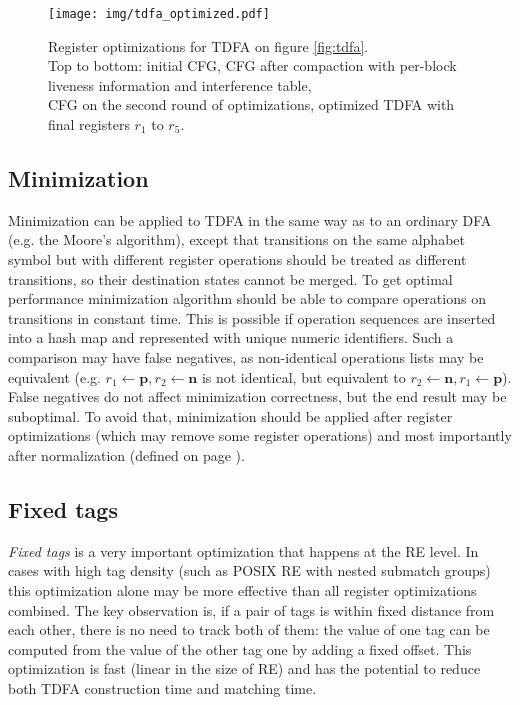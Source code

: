 \documentclass[]{article}
\begin{document}
\begin{figure}[]
\texttt{[image: img/tdfa\_optimized.pdf]}
\vspace{0.5em}
\caption{
Register optimizations for TDFA on figure \ref{fig:tdfa}. \\
Top to bottom: initial CFG,
CFG after compaction with per-block liveness information and interference table,\\
CFG on the second round of optimizations,
optimized TDFA with final registers $r_1$ to $r_5$.
}\label{fig:tdfa_regopt}
\end{figure}

\subsection{Minimization}

Minimization can be applied to TDFA in the same way as to an ordinary DFA (e.g. the Moore's algorithm),
except that transitions on the same alphabet symbol but with different register operations
should be treated as different transitions, so their destination states cannot be merged.
To get optimal performance minimization algorithm should be able to compare operations on transitions in constant time.
This is possible if operation sequences are inserted into a hash map and represented with unique numeric identifiers.
Such a comparison may have false negatives, as non-identical operations lists may be equivalent
(e.g. $r_1 \leftarrow \mathbf{p}, r_2 \leftarrow \mathbf{n}$ is not identical, but equivalent to $r_2 \leftarrow \mathbf{n}, r_1 \leftarrow \mathbf{p}$).
False negatives do not affect minimization correctness, but the end result may be suboptimal.
To avoid that, minimization should be applied after register optimizations (which may remove some register operations)
and most importantly after normalization (defined on page \pageref{alg_opt2}).

\subsection{Fixed tags}

\newcommand\nan{N\!an}
\newcommand\nobasetag{-1}%

\emph{Fixed tags} is a very important optimization that happens at the RE level.
In cases with high tag density (such as POSIX RE with nested submatch groups)
this optimization alone may be more effective than all register optimizations combined.
%
The key observation is,
if a pair of tags is within fixed distance from each other, there is no need to track both of them:
the value of one tag can be computed from the value of the other tag one by adding a fixed offset.
%
This optimization is fast (linear in the size of RE)
and has the potential to reduce both TDFA construction time and matching time.
\medskip
\end{document}
